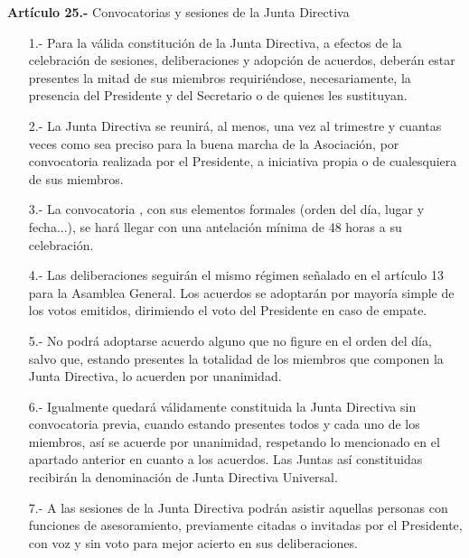 \documentclass[a4paper,12pt]{article}
\begin{document}
\begin{onehalfspace}
\bigskip\bigskip
\newpage
\textbf{Artículo 25.-} Convocatorias y sesiones de la Junta Directiva
\begin{itemize}
\item [1.-] Para la válida constitución de la Junta Directiva, a efectos de la celebración de sesiones, deliberaciones y adopción de acuerdos, deberán estar presentes la mitad de sus miembros requiriéndose, necesariamente, la presencia del Presidente y del Secretario o de quienes les sustituyan.
\item [2.-] La Junta Directiva se reunirá, al menos, una vez al trimestre y cuantas veces como sea preciso para la buena marcha de la Asociación, por convocatoria realizada por el Presidente, a iniciativa propia o de cualesquiera de sus miembros.
\item [3.-] La convocatoria , con sus elementos formales (orden del día, lugar y fecha...), se hará llegar con una antelación mínima de 48 horas a su celebración.
\item [4.-] Las deliberaciones seguirán el mismo régimen señalado en el artículo 13 para la Asamblea General. Los acuerdos se adoptarán por mayoría simple de los votos emitidos, dirimiendo el voto del Presidente en caso de empate.
\item [5.-] No podrá adoptarse acuerdo alguno que no figure en el orden del día, salvo que, estando presentes la totalidad de los miembros que componen la Junta Directiva, lo acuerden por unanimidad.
\item [6.-] Igualmente quedará válidamente constituida la Junta Directiva sin convocatoria previa, cuando estando presentes todos y cada uno de los miembros, así se acuerde por unanimidad, respetando lo mencionado en el apartado anterior en cuanto a los acuerdos. Las Juntas así constituidas recibirán la denominación de Junta Directiva Universal.
\item [7.-] A las sesiones de la Junta Directiva podrán asistir aquellas personas con funciones de asesoramiento, previamente citadas o invitadas por el Presidente, con voz y sin voto para mejor acierto en sus deliberaciones.
\end{itemize}

\bigskip\bigskip


\end{onehalfspace}
\end{document}
